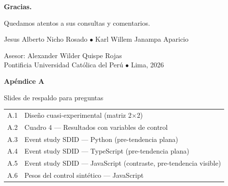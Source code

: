 \documentclass[10pt,aspectratio=169]{beamer}
\begin{document}
{
\begin{frame}[plain]
\vfill
\centering
\color{white}
{\Huge\bfseries Gracias.}\par
\vspace{1em}
{\Large Quedamos atentos a sus consultas y comentarios.}\par
\vfill
\small Jesus Alberto Nicho Rosado \quad $\bullet$ \quad Karl Willem Janampa Aparicio\par
\vspace{0.3em}
\small Asesor: Alexander Wilder Quispe Rojas \\
\small Pontificia Universidad Católica del Perú \quad $\bullet$ \quad Lima, 2026
\vfill
\end{frame}
}


\appendix

{
\begin{frame}[plain]
\vfill
\centering
\color{white}
{\Huge\bfseries Apéndice A}\par
\vspace{0.5em}
{\Large Slides de respaldo para preguntas}\par
\vfill
\small
\begin{tabular}{rl}
A.1 & Diseño cuasi-experimental (matriz 2$\times$2) \\
A.2 & Cuadro 4 --- Resultados con variables de control \\
A.3 & Event study SDID --- Python (pre-tendencia plana) \\
A.4 & Event study SDID --- TypeScript (pre-tendencia plana) \\
A.5 & Event study SDID --- JavaScript (contraste, pre-tendencia visible) \\
A.6 & Pesos del control sintético --- JavaScript \\
\end{tabular}
\vfill
\end{frame}
}
\end{document}
